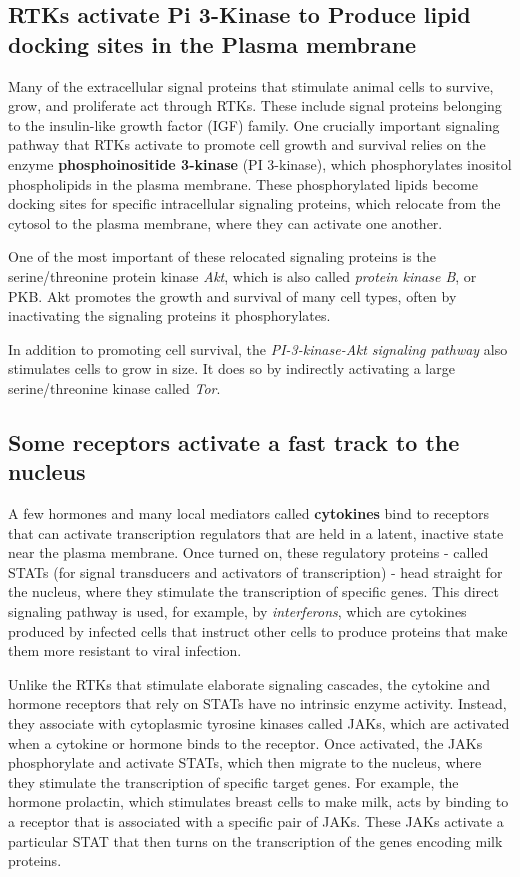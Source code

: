 \subsection{RTKs activate Pi 3-Kinase to Produce lipid docking sites in the Plasma membrane}

Many of the extracellular signal proteins that stimulate animal cells to
survive, grow, and proliferate act through RTKs. These include signal
proteins belonging to the insulin-like growth factor (IGF) family. One
crucially important signaling pathway that RTKs activate to promote cell
growth and survival relies on the enzyme \textbf{phosphoinositide 3-kinase}
(PI 3-kinase), which phosphorylates inositol phospholipids in the plasma
membrane. These phosphorylated lipids become docking sites for specific
intracellular signaling proteins, which relocate from the cytosol to
the plasma membrane, where they can activate one another.

One of the most important of these relocated signaling proteins is the
serine/threonine protein kinase \textit{Akt}, which is also called \textit{protein kinase B},
or PKB. Akt promotes the growth and survival of many cell
types, often by inactivating the signaling proteins it phosphorylates.

In addition to promoting cell survival, the \textit{PI-3-kinase-Akt signaling pathway}
also stimulates cells to grow in size. It does so by indirectly activating
a large serine/threonine kinase called \textit{Tor}.

\subsection{Some receptors activate a fast track to the nucleus}

A few hormones and many local mediators called \textbf{cytokines} bind to
receptors that can activate transcription regulators that are held in a
latent, inactive state near the plasma membrane. Once turned on, these
regulatory proteins - called STATs (for signal transducers and activators
of transcription) - head straight for the nucleus, where they stimulate the
transcription of specific genes. This direct signaling pathway is used, for
example, by \textit{interferons}, which are cytokines produced by infected cells
that instruct other cells to produce proteins that make them more resistant
to viral infection.

Unlike the RTKs that stimulate elaborate signaling cascades, the cytokine
and hormone receptors that rely on STATs have no intrinsic enzyme activity.
Instead, they associate with cytoplasmic tyrosine kinases called JAKs,
which are activated when a cytokine or hormone binds to the receptor.
Once activated, the JAKs phosphorylate and activate STATs, which then
migrate to the nucleus, where they stimulate the transcription of specific
target genes. For example, the hormone prolactin, which stimulates
breast cells to make milk, acts by binding to a receptor that is associated
with a specific pair of JAKs. These JAKs activate a particular STAT
that then turns on the transcription of the genes encoding milk proteins.

